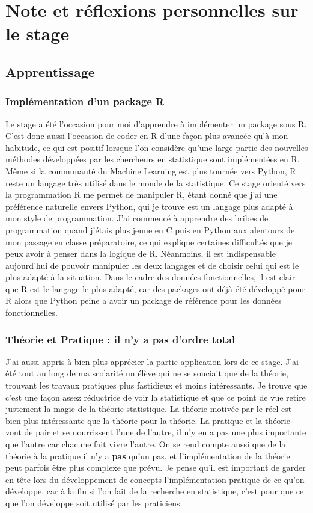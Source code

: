 \chapter{Note et réflexions personnelles sur le stage}


\section{Apprentissage}

\subsection{Implémentation d'un package R}

Le stage a été l'occasion pour moi d'apprendre à implémenter un package sous R. C'est donc aussi l'occasion de coder en R d'une façon plus avancée qu'à mon habitude, ce qui est positif lorsque l'on considère qu'une large partie des nouvelles méthodes développées par les chercheurs en statistique sont implémentées en R. Même si la communauté du Machine Learning est plus tournée vers Python, R reste un langage très utilisé dans le monde de la statistique. Ce stage orienté vers la programmation R me permet de manipuler R, étant donné que j'ai une préférence naturelle envers Python, qui je trouve est un langage plus adapté à mon style de programmation. J'ai commencé à apprendre des bribes de programmation quand j'étais plus jeune en C puis en Python aux alentours de mon passage en classe préparatoire, ce qui explique certaines difficultés que je peux avoir à penser dans la logique de R. Néanmoins, il est indispensable aujourd'hui de pouvoir manipuler les deux langages et de choisir celui qui est le plus adapté à la situation. Dans le cadre des données fonctionnelles, il est clair que R est le langage le plus adapté, car des packages ont déjà été développé pour R alors que Python peine a avoir un package de référence pour les données fonctionnelles.

\subsection{Théorie et Pratique : il n'y a pas d'ordre total}

J'ai aussi appris à bien plus apprécier la partie application lors de ce stage. J'ai été tout au long de ma scolarité un élève qui ne se souciait que de la théorie, trouvant les travaux pratiques plus fastidieux et moins intéressants. Je trouve que c'est une façon assez réductrice de voir la statistique et que ce point de vue retire justement la magie de la théorie statistique. La théorie motivée par le réel est bien plus intéressante que la théorie pour la théorie. La pratique et la théorie vont de pair et se nourrissent l'une de l'autre, il n'y en a pas une plus importante que l'autre car chacune fait vivre l'autre. On se rend compte aussi que de la théorie à la pratique il n'y a \textbf{pas} qu'un pas, et l'implémentation de la théorie peut parfois être plus complexe que prévu. Je pense qu'il est important de garder en tête lors du développement de concepts l'implémentation pratique de ce qu'on développe, car à la fin si l'on fait de la recherche en statistique, c'est pour que ce que l'on développe soit utilisé par les praticiens.

